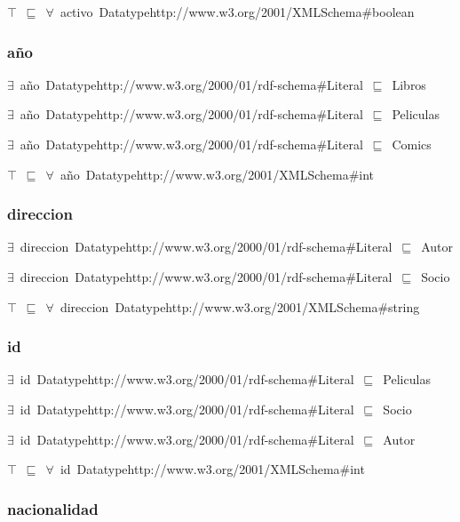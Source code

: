 \documentclass{article}
\begin{document}
\ensuremath{\top}~\ensuremath{\sqsubseteq}~\ensuremath{\forall}~activo~Datatypehttp://www.w3.org/2001/XMLSchema#boolean

\subsubsection*{año}

\ensuremath{\exists}~año~Datatypehttp://www.w3.org/2000/01/rdf-schema#Literal~\ensuremath{\sqsubseteq}~Libros

\ensuremath{\exists}~año~Datatypehttp://www.w3.org/2000/01/rdf-schema#Literal~\ensuremath{\sqsubseteq}~Peliculas

\ensuremath{\exists}~año~Datatypehttp://www.w3.org/2000/01/rdf-schema#Literal~\ensuremath{\sqsubseteq}~Comics

\ensuremath{\top}~\ensuremath{\sqsubseteq}~\ensuremath{\forall}~año~Datatypehttp://www.w3.org/2001/XMLSchema#int

\subsubsection*{direccion}

\ensuremath{\exists}~direccion~Datatypehttp://www.w3.org/2000/01/rdf-schema#Literal~\ensuremath{\sqsubseteq}~Autor

\ensuremath{\exists}~direccion~Datatypehttp://www.w3.org/2000/01/rdf-schema#Literal~\ensuremath{\sqsubseteq}~Socio

\ensuremath{\top}~\ensuremath{\sqsubseteq}~\ensuremath{\forall}~direccion~Datatypehttp://www.w3.org/2001/XMLSchema#string

\subsubsection*{id}

\ensuremath{\exists}~id~Datatypehttp://www.w3.org/2000/01/rdf-schema#Literal~\ensuremath{\sqsubseteq}~Peliculas

\ensuremath{\exists}~id~Datatypehttp://www.w3.org/2000/01/rdf-schema#Literal~\ensuremath{\sqsubseteq}~Socio

\ensuremath{\exists}~id~Datatypehttp://www.w3.org/2000/01/rdf-schema#Literal~\ensuremath{\sqsubseteq}~Autor

\ensuremath{\top}~\ensuremath{\sqsubseteq}~\ensuremath{\forall}~id~Datatypehttp://www.w3.org/2001/XMLSchema#int

\subsubsection*{nacionalidad}
\end{document}
